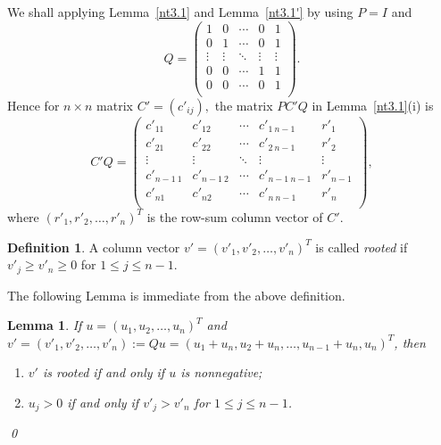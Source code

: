 \documentclass[final,3p, times, 12pt]{elsarticle}
\theoremstyle{plain}
\newtheorem{lem}[thm]{Lemma}
\theoremstyle{definition}
\newtheorem{defn}[thm]{Definition}
\theoremstyle{remark}
\numberwithin{equation}{section}
\begin{document}
We shall applying Lemma~\ref{nt3.1} and Lemma~\ref{nt3.1'} by using $P=I$ and
\begin{equation}\label{defnq}
Q=\begin{pmatrix}
1 & 0 & \cdots & 0 & 1 \\
0 & 1 & \cdots & 0 & 1 \\
\vdots & \vdots & \ddots & \vdots & \vdots \\
0 & 0 & \cdots & 1 & 1 \\
0 & 0 & \cdots & 0 & 1 \\
\end{pmatrix}.
\end{equation}
Hence for $n\times n$ matrix $C'=(c'_{ij}),$ the matrix $PC'Q$ in Lemma~\ref{nt3.1}(i) is
\begin{equation}\label{C'Q}C'Q=\begin{pmatrix}
c'_{11} & c'_{12} & \cdots & c'_{1\ n-1} & r'_1\\
c'_{21} & c'_{22} & \cdots & c'_{2\ n-1} & r'_2\\
\vdots & \vdots & \ddots & \vdots & \vdots \\
c'_{n-1\ 1} & c'_{n-1\ 2} & \cdots & c'_{n-1\ n-1} & r'_{n-1}\\
c'_{n1} & c'_{n2} & \cdots & c'_{n\ n-1} & r'_n\\
\end{pmatrix},
\end{equation}
where $(r'_1, r'_2, \ldots, r'_n)^T$ is the row-sum column vector of $C'.$



\begin{defn}\label{d3.1}
 A column vector $v'=(v'_1,v'_2,\ldots,v'_n)^T$ is called {\it rooted}  if $v'_j\geq v'_n\geq 0$  for $1\leq j\leq n-1$.
\end{defn}


The following Lemma is immediate from the above definition.
\begin{lem}\label{l3.15}
If $u=(u_1, u_2, \ldots, u_n)^T$ and $v'=(v'_1, v'_2, \ldots, v'_n):=Qu=(u_1+u_n, u_2+u_n, \ldots, u_{n-1}+u_n, u_n)^T$, then
\begin{enumerate}
\item[(i)] $v'$ is rooted  if and only if  $u$ is nonnegative;
\item[(ii)] $u_j>0$ if and only if $v'_j>v'_n$ for $1\leq j\leq n-1$.
\end{enumerate}\qed
\end{lem}
\end{document}
